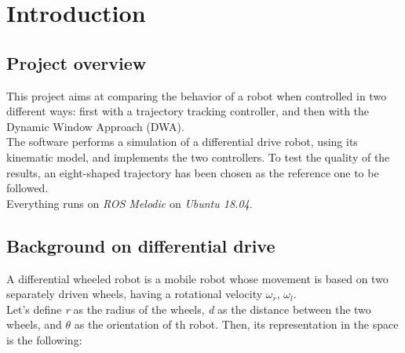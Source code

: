 \documentclass[11pt,a4paper]{article}
\begin{document}


\newpage

\renewcommand*\contentsname{Table of Contents}
\tableofcontents

\newpage





\section{Introduction}


\subsection{Project overview}

This project aims at comparing the behavior of a robot when controlled in two different ways: first with a
trajectory tracking controller, and then with the Dynamic Window Approach (DWA).\\

The software performs a simulation of a differential drive robot, using its kinematic model, and implements
the two controllers. To test the quality of the results, an eight-shaped trajectory has been chosen as the
reference one to be followed.\\

Everything runs on \textit{ROS Melodic} on \textit{Ubuntu 18.04}.


\subsection{Background on differential drive}


A differential wheeled robot is a mobile robot whose movement is based on two separately driven wheels,
having a rotational velocity $\omega_r$, $\omega_l$. \\

Let's define \textit{r} as the radius of the wheels, \textit{d} as the distance between the two wheels,
and $\theta$ as the orientation of th robot. Then, its representation in the space is the following:
\end{document}
